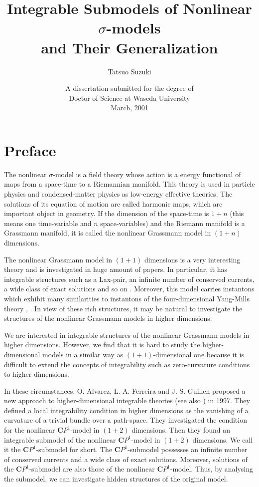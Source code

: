 \documentclass[makeidx,12pt,openany]{report}
\title{Integrable Submodels of Nonlinear $\sigma$-models \\
and Their Generalization}
\author{Tatsuo Suzuki}
\date{A dissertation submitted for the degree of \\
Doctor of Science at Waseda University \\ 
March, 2001}
\begin{document}
\maketitle
 \setlength{\baselineskip}{20pt}

\chapter*{Preface}

The nonlinear $\sigma$-model is a field theory whose action is a 
energy functional of maps from a space-time to a Riemannian manifold. 
This theory is used in particle physics and condensed-matter physics as 
low-energy effective theories. 
The solutions of its equation of motion are called harmonic maps, 
which are important object in geometry. 
If the dimension of the space-time is $1+n$ (this means one time-variable 
and $n$ space-variables) and the Riemann manifold is a Grassmann manifold, 
it is called the nonlinear Grassmann model in $(1+n)$ dimensions. 

The nonlinear Grassmann model in $(1+1)$ dimensions is a 
very interesting theory and is investigated in huge amount of papers. 
In particular, it has integrable structures such as 
a Lax-pair, an infinite number of conserved currents, a wide class of 
exact solutions and so on \cite{Zak}. 
Moreover, this model carries instantons which exhibit many similarities 
to instantons of the four-dimensional Yang-Mills theory \cite{Zak}, \cite{Raj}. In view of these rich structures, 
it may be natural to investigate the structures of the nonlinear 
Grassmann models in higher dimensions. 

We are interested in integrable structures of the nonlinear 
Grassmann models in higher dimensions. However, 
we find that it is hard to study the higher-dimensional models 
in a similar way as $(1+1)$-dimensional one because it is difficult to extend 
the concepts of integrability such as zero-curvature conditions 
to higher dimensions. 

In these circumstances, O. Alvarez, L. A. Ferreira and J. S. Guillen 
proposed a new approach to higher-dimensional integrable theories 
\cite{AFG1} (see also \cite{AFG2}) in 1997. They defined 
a local integrability condition in higher dimensions as the vanishing of 
a curvature of a trivial bundle over a path-space. 
They investigated the condition for the 
nonlinear ${\mathbf{C}}P^1$-model in $(1+2)$ dimensions. Then 
they found an integrable submodel of the 
nonlinear ${\mathbf{C}}P^1$-model in $(1+2)$ dimensions. 
We call it the $\mathbf{C}P^1$-submodel for short. 
The $\mathbf{C}P^1$-submodel possesses an infinite number of 
conserved currents and a wide class of exact solutions. 
Moreover, solutions of the $\mathbf{C}P^1$-submodel are also those of 
the nonlinear $\mathbf{C}P^1$-model. Thus, by analysing the submodel, 
we can investigate hidden structures of the original model. 
\end{document}
